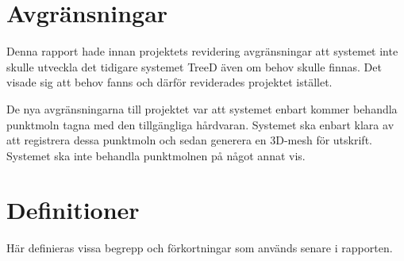 \section{Avgränsningar}
\label{sec:delimitations}
Denna rapport hade innan projektets revidering avgränsningar att systemet inte skulle utveckla det tidigare systemet TreeD även om behov skulle finnas. Det visade sig att behov fanns och därför reviderades projektet istället.

De nya avgränsningarna till projektet var att systemet enbart kommer behandla punktmoln tagna med den tillgängliga hårdvaran. Systemet ska enbart klara av att registrera dessa punktmoln och sedan generera en 3D-mesh för utskrift. Systemet ska inte behandla punktmolnen på något annat vis.

\section{Definitioner}
\label{sec:definitions}
Här definieras vissa begrepp och förkortningar som används senare i rapporten.

